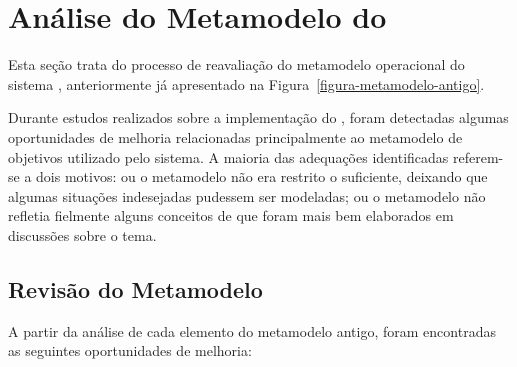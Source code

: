 
\chapter{Análise do Metamodelo do \zanshin}
\label{sec-zanshin}

Esta seção trata do processo de reavaliação do metamodelo operacional do sistema \zanshin, anteriormente já apresentado na Figura~\ref{figura-metamodelo-antigo}.


Durante estudos realizados sobre a implementação do \framework \zanshin, foram detectadas algumas oportunidades de melhoria relacionadas principalmente ao metamodelo de objetivos utilizado pelo sistema. A maioria das adequações identificadas referem-se a dois motivos: ou o metamodelo não era restrito o suficiente, deixando que algumas situações indesejadas pudessem ser modeladas; ou o metamodelo não refletia fielmente alguns conceitos de \gore que foram mais bem elaborados em discussões sobre o tema. 



\section{Revisão do Metamodelo}
\label{sec-zanshin-revisao}
A partir da análise de cada elemento do metamodelo antigo, foram encontradas as seguintes oportunidades de melhoria:

